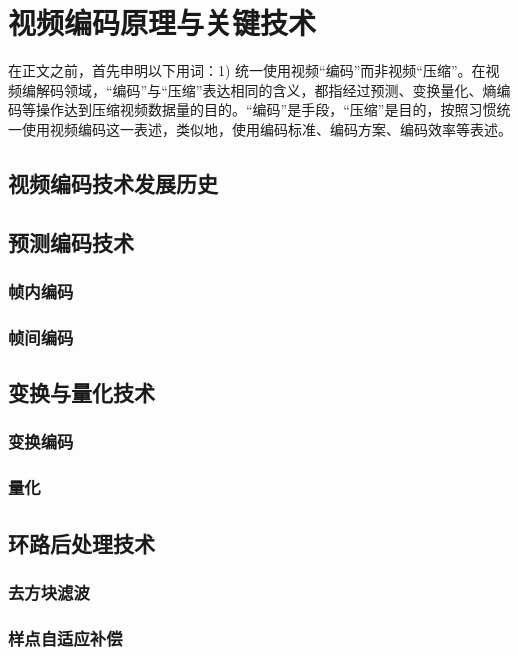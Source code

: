 \chapter{视频编码原理与关键技术}
\label{cha:c2}
在正文之前，首先申明以下用词：1) 统一使用视频“编码”而非视频“压缩”。在视频编解码领域，“编码”与“压缩”表达相同的含义，都指经过预测、变换量化、熵编码等操作达到压缩视频数据量的目的。“编码”是手段，“压缩”是目的，按照习惯统一使用视频编码这一表述，类似地，使用编码标准、编码方案、编码效率等表述。

\section{视频编码技术发展历史}

\section{预测编码技术}
\subsection{帧内编码}
\subsection{帧间编码}

\section{变换与量化技术}
\subsection{变换编码}
\subsection{量化}

\section{环路后处理技术}
\subsection{去方块滤波}
\subsection{样点自适应补偿}

